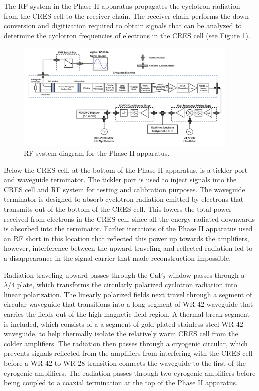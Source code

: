 The RF system in the Phase II apparatus propagates the cyclotron radiation from the CRES cell to the receiver chain. The receiver chain performs the down-conversion and digitization required to obtain signals that can be analyzed to determine the cyclotron frequencies of electrons in the CRES cell (see Figure \ref{fig:chap3-phase2-rf-chain}).
\begin{figure}[htbp]
    \centering
    \includegraphics*[width=0.95\textwidth]{figs/Chapter-3/230620_phase2_rf_chain.png}
    \caption{\label{fig:chap3-phase2-rf-chain} RF system diagram for the Phase II apparatus.}
\end{figure}

Below the CRES cell, at the bottom of the Phase II apparatus, is a tickler port and waveguide terminator. The tickler port is used to inject signals into the CRES cell and RF system for testing and calibration purposes. The waveguide terminator is designed to absorb cyclotron radiation emitted by electrons that transmits out of the bottom of the CRES cell. This lowers the total power received from electrons in the CRES cell, since all the energy radiated downwards is absorbed into the terminator. Earlier iterations of the Phase II apparatus used an RF short in this location that reflected this power up towards the amplifiers, however, interference between the upward traveling and reflected radiation led to a disappearance in the signal carrier that made reconstruction impossible.

Radiation traveling upward passes through the $\mathrm{CaF}_2$ window passes through a $\lambda/4$ plate, which transforms the circularly polarized cyclotron radiation into linear polarization. The linearly polarized fields next travel through a segment of circular waveguide that transitions into a long segment of WR-42 waveguide that carries the fields out of the high magnetic field region. A thermal break segment is included, which consists of a a segment of gold-plated stainless steel WR-42 waveguide, to help thermally isolate the relatively warm CRES cell from the colder amplifiers. The radiation then passes through a cryogenic circular, which prevents signals reflected from the amplifiers from interfering with the CRES cell before a WR-42 to WR-28 transition connects the waveguide to the first of the cyrogenic amplifiers. The radiation passes through two cyrogenic amplifiers before being coupled to a coaxial termination at the top of the Phase II apparatus.

